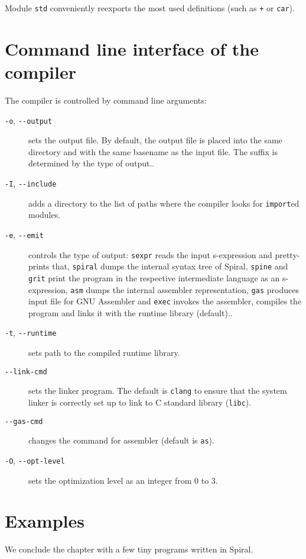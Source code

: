 Module \texttt{std} conveniently reexports the most used definitions (such as
\texttt{+} or \texttt{car}).

\section{Command line interface of the compiler}

The compiler is controlled by command line arguments:

\begin{description}
  \item[\texttt{-o}, \texttt{-{}-output}] sets the output file. By default, the
    output file is placed into the same directory and with the same basename as
    the input file. The suffix is determined by the type of output..
  \item[\texttt{-I}, \texttt{-{}-include}] adds a directory to the list of paths
    where the compiler looks for \texttt{import}ed modules.
  \item[\texttt{-e}, \texttt{-{}-emit}] controls the type of output:
    \texttt{sexpr} reads the input s-expression and pretty-prints that,
    \texttt{spiral} dumps the internal syntax tree of Spiral, \texttt{spine} and
    \texttt{grit} print the program in the respective intermediate language as
    an s-expression, \texttt{asm} dumps the internal assembler representation,
    \texttt{gas} produces input file for GNU Assembler and \texttt{exec} invokes
    the assembler, compiles the program and links it with the runtime library
    (default)..
  \item[\texttt{-t}, \texttt{-{}-runtime}] sets path to the compiled runtime
    library.
  \item[\texttt{-{}-link-cmd}] sets the linker program. The default is
    \texttt{clang} to ensure that the system linker is correctly set up to link
    to C standard library (\texttt{libc}).
  \item[\texttt{-{}-gas-cmd}] changes the command for assembler (default is
    \texttt{as}).
  \item[\texttt{-O}, \texttt{-{}-opt-level}] sets the optimization level as
    an integer from 0 to 3.
\end{description}

\section{Examples}

We conclude the chapter with a few tiny programs written in Spiral.

